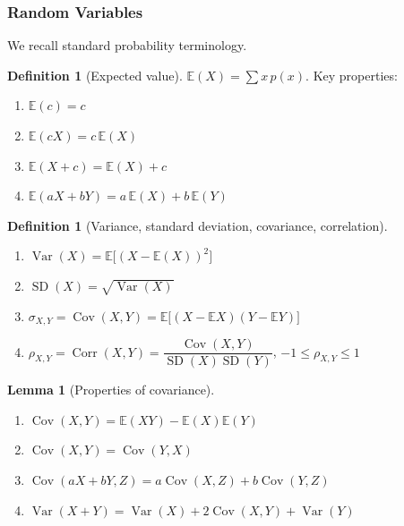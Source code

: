 \documentclass[12pt, a4paper]{article}
\theoremstyle{plain}
\newtheorem{lemma}[theorem]{Lemma}
\theoremstyle{definition}
\newtheorem{definition}[theorem]{Definition}
\theoremstyle{remark}
\begin{document}
\pagebreak
\subsubsection*{Random Variables}

We recall standard probability terminology.

\begin{definition}[Expected value]
  $\mathbb{E}(X) = \sum x\, p(x)$. Key properties:
  \begin{enumerate}
    \item $\mathbb{E}(c) = c$
    \item $\mathbb{E}(cX) = c\,\mathbb{E}(X)$
    \item $\mathbb{E}(X + c) = \mathbb{E}(X) + c$
    \item $\mathbb{E}(aX + bY) = a\,\mathbb{E}(X) + b\,\mathbb{E}(Y)$
  \end{enumerate}
\end{definition}

\begin{definition}[Variance, standard deviation, covariance, correlation]
  \begin{enumerate}
    \item $\operatorname{Var}(X) = \mathbb{E}\bigl[(X - \mathbb{E}(X))^2\bigr]$
    \item $\operatorname{SD}(X) = \sqrt{\operatorname{Var}(X)}$
    \item $\sigma_{X,Y} = \operatorname{Cov}(X,Y) = \mathbb{E}\bigl[(X-\mathbb{E}X)(Y-\mathbb{E}Y)\bigr]$
    \item $\rho_{X,Y} = \operatorname{Corr}(X,Y) = \dfrac{\operatorname{Cov}(X,Y)}{\operatorname{SD}(X)\operatorname{SD}(Y)}$, \quad $-1 \leq \rho_{X,Y} \leq 1$
  \end{enumerate}
\end{definition}

\begin{lemma}[Properties of covariance]
  \begin{enumerate}
    \item $\operatorname{Cov}(X,Y) = \mathbb{E}(XY) - \mathbb{E}(X)\mathbb{E}(Y)$
    \item $\operatorname{Cov}(X,Y) = \operatorname{Cov}(Y,X)$
    \item $\operatorname{Cov}(aX+bY,Z) = a\operatorname{Cov}(X,Z) + b\operatorname{Cov}(Y,Z)$
    \item $\operatorname{Var}(X+Y) = \operatorname{Var}(X) + 2\operatorname{Cov}(X,Y) + \operatorname{Var}(Y)$
  \end{enumerate}
\end{lemma}
\end{document}
